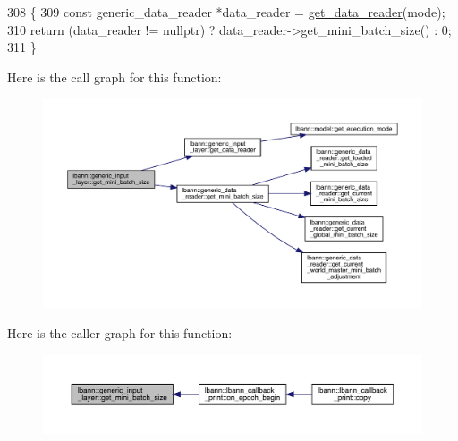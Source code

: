 \begin{DoxyCode}
308                                                              \{
309     \textcolor{keyword}{const} generic\_data\_reader *data\_reader = \hyperlink{classlbann_1_1generic__input__layer_aba732becdb02627e3ad4493ac19e8fb6}{get\_data\_reader}(mode);
310     \textcolor{keywordflow}{return} (data\_reader != \textcolor{keyword}{nullptr}) ? data\_reader->get\_mini\_batch\_size() : 0;
311   \}
\end{DoxyCode}
Here is the call graph for this function\+:\nopagebreak
\begin{figure}[H]
\begin{center}
\leavevmode
\includegraphics[width=350pt]{classlbann_1_1generic__input__layer_a8af40ec1991900bf23b78e6429256b9c_cgraph}
\end{center}
\end{figure}
Here is the caller graph for this function\+:\nopagebreak
\begin{figure}[H]
\begin{center}
\leavevmode
\includegraphics[width=350pt]{classlbann_1_1generic__input__layer_a8af40ec1991900bf23b78e6429256b9c_icgraph}
\end{center}
\end{figure}
\mbox{\label{classlbann_1_1generic__input__layer_aa0fa6597ffce537f7cfba29dcc754ee1}} 
